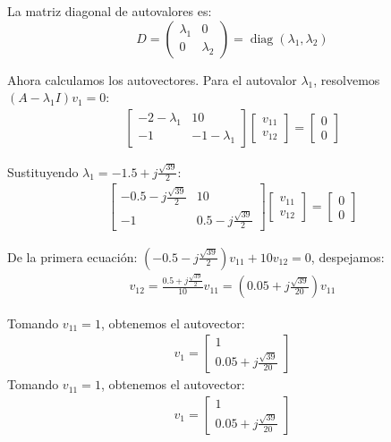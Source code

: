 \documentclass[
  11pt,
  letterpaper,
   addpoints,
  answers
  ]{exam}
\begin{document}
\begin{solution}
La matriz diagonal de autovalores es:
\begin{equation}
  D = \begin{pmatrix} \lambda_1 & 0 \\ 0 & \lambda_2 \end{pmatrix} = \operatorname{diag}(\lambda_1,\lambda_2)
\end{equation}

Ahora calculamos los autovectores. Para el autovalor $\lambda_1$, resolvemos $(A - \lambda_1 I)v_1 = 0$:
\begin{align}
  \begin{bmatrix}
    -2 - \lambda_1 & 10 \\
    -1 & -1 - \lambda_1
  \end{bmatrix}
  \begin{bmatrix}
    v_{11} \\ v_{12}
  \end{bmatrix}
  = \begin{bmatrix}
    0 \\ 0
  \end{bmatrix}
\end{align}

Sustituyendo $\lambda_1 = -1.5 + j\frac{\sqrt{39}}{2}$:
\begin{align}
  \begin{bmatrix}
    -0.5 - j\frac{\sqrt{39}}{2} & 10 \\
    -1 & 0.5 - j\frac{\sqrt{39}}{2}
  \end{bmatrix}
  \begin{bmatrix}
    v_{11} \\ v_{12}
  \end{bmatrix}
  = \begin{bmatrix}
    0 \\ 0
  \end{bmatrix}
\end{align}

De la primera ecuación: $\left(-0.5 - j\frac{\sqrt{39}}{2}\right)v_{11} + 10v_{12} = 0$, despejamos:
\begin{align}
v_{12} = \frac{0.5 + j\frac{\sqrt{39}}{2}}{10}v_{11} = \left(0.05 + j\frac{\sqrt{39}}{20}\right)v_{11}
\end{align}

Tomando $v_{11}=1$, obtenemos el autovector:
\begin{align}
  v_1 = \begin{bmatrix} 1 \\ 0.05 + j\frac{\sqrt{39}}{20} \end{bmatrix}
\end{align}
Tomando $v_{11}=1$, obtenemos el autovector:
\begin{align}
  v_1 = \begin{bmatrix} 1 \\ 0.05 + j\frac{\sqrt{39}}{20} \end{bmatrix}
\end{align}


\end{solution}
\end{document}
